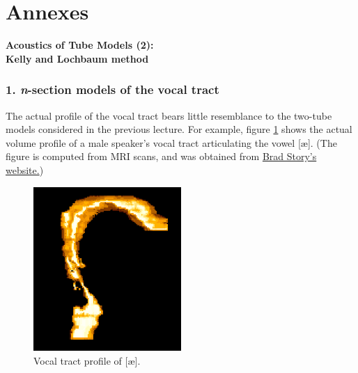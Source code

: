 \chapter*{Annexes}


{}
\thispagestyle{empty}

{\LARGE \textbf{Acoustics of Tube Models (2):\\ Kelly and Lochbaum method}}\label{atm}

\subsection*{1. \textit{n}-section models of the vocal tract}

The actual profile of the vocal tract bears little resemblance to the two-tube models considered in the previous lecture. For example, figure \ref{f1} shows the actual volume profile of a male speaker's vocal tract articulating the vowel {[}æ{]}. (The figure is computed from MRI scans, and was obtained from \href{https://slhs.arizona.edu/person/brad-story-phd}{Brad Story's website.})

\captionsetup[figure]{list=no}
\setcounter{figure}{0}
\makeatletter 
\renewcommand{\thefigure}{\@arabic\c@figure}
\makeatother

\begin{figure}[htbp]
\begin{center}
\includegraphics[width=0.5\textwidth]{mp/img/male-ae.png}
\caption{Vocal tract profile of {[}æ{]}.}
\label{f1}
\end{center}
\end{figure}

\newpage 

